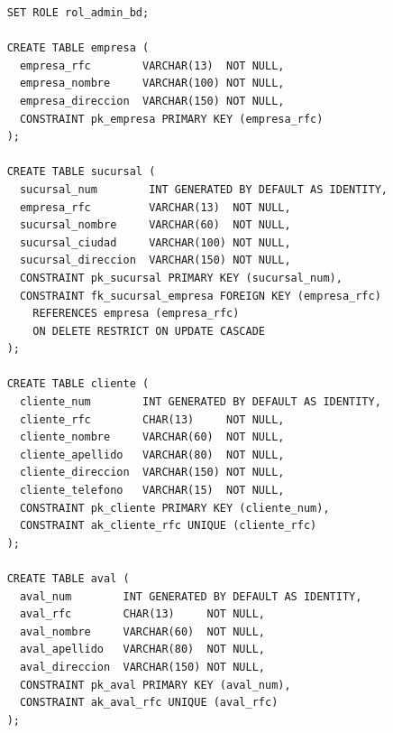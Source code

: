 \begin{verbatim}
	SET ROLE rol_admin_bd;

	CREATE TABLE empresa (
	  empresa_rfc        VARCHAR(13)  NOT NULL,
	  empresa_nombre     VARCHAR(100) NOT NULL,
	  empresa_direccion  VARCHAR(150) NOT NULL,
	  CONSTRAINT pk_empresa PRIMARY KEY (empresa_rfc)
	);

	CREATE TABLE sucursal (
	  sucursal_num        INT GENERATED BY DEFAULT AS IDENTITY,
	  empresa_rfc         VARCHAR(13)  NOT NULL,
	  sucursal_nombre     VARCHAR(60)  NOT NULL,
	  sucursal_ciudad     VARCHAR(100) NOT NULL,
	  sucursal_direccion  VARCHAR(150) NOT NULL,
	  CONSTRAINT pk_sucursal PRIMARY KEY (sucursal_num),
	  CONSTRAINT fk_sucursal_empresa FOREIGN KEY (empresa_rfc)
	    REFERENCES empresa (empresa_rfc)
	    ON DELETE RESTRICT ON UPDATE CASCADE
	);

	CREATE TABLE cliente (
	  cliente_num        INT GENERATED BY DEFAULT AS IDENTITY,
	  cliente_rfc        CHAR(13)     NOT NULL,
	  cliente_nombre     VARCHAR(60)  NOT NULL,
	  cliente_apellido   VARCHAR(80)  NOT NULL,
	  cliente_direccion  VARCHAR(150) NOT NULL,
	  cliente_telefono   VARCHAR(15)  NOT NULL,
	  CONSTRAINT pk_cliente PRIMARY KEY (cliente_num),
	  CONSTRAINT ak_cliente_rfc UNIQUE (cliente_rfc)
	);

	CREATE TABLE aval (
	  aval_num        INT GENERATED BY DEFAULT AS IDENTITY,
	  aval_rfc        CHAR(13)     NOT NULL,
	  aval_nombre     VARCHAR(60)  NOT NULL,
	  aval_apellido   VARCHAR(80)  NOT NULL,
	  aval_direccion  VARCHAR(150) NOT NULL,
	  CONSTRAINT pk_aval PRIMARY KEY (aval_num),
	  CONSTRAINT ak_aval_rfc UNIQUE (aval_rfc)
	);


\end{verbatim}
